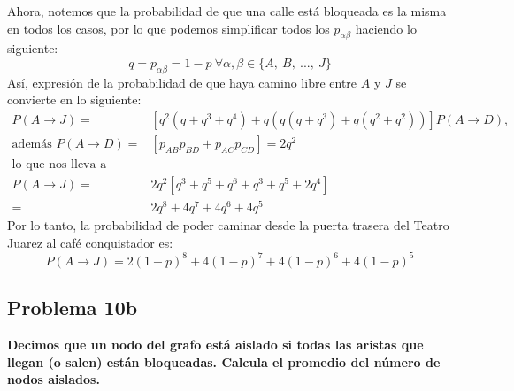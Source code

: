 Ahora, notemos que la probabilidad de que una calle está bloqueada es la misma en todos los casos, por lo que podemos simplificar todos los $p_{\alpha\beta}$ haciendo lo siguiente:
$$
    q = p_{\alpha\beta}=1-p\ \forall\alpha, \beta\in\{A,\ B,\ ...,\ J\}
$$
Así, expresión de la probabilidad de que haya camino libre entre $A$ y $J$ se convierte en lo siguiente:
\begin{align*}
    P(A\rightarrow J) =                & \left[ q^2(q+q^3+q^4) +q(q(q+q^3)+q(q^2+q^2))\right]P(A\rightarrow D), \\
    \text{además } P(A\rightarrow D) = & \left[p_{AB}p_{BD}+p_{AC}p_{CD}\right] = 2q^2                          \\
    \text{lo que nos lleva a }         &                                                                        \\
    P(A\rightarrow J) =                & 2q^2\left[ q^3+q^5 + q^6 + q^3+ q^5+ 2q^4\right]                       \\
    =                                  & 2q^8+4q^7+4q^6+4q^5
\end{align*}
Por lo tanto, la probabilidad de poder caminar desde la puerta trasera del Teatro Juarez al café conquistador es:
$$
    P(A\rightarrow J) = 2(1-p)^8+4(1-p)^7+4(1-p)^6+4(1-p)^5
$$
\subsection*{Problema 10b}
\textbf{Decimos que un nodo del grafo está aislado si todas las aristas que llegan (o salen) están bloqueadas. Calcula el promedio del número de nodos aislados.}